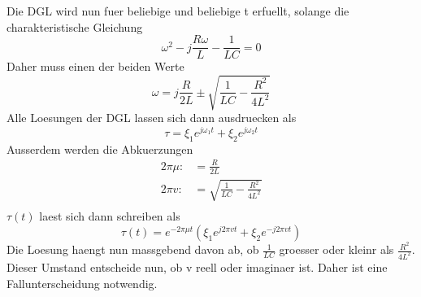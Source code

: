 \documentclass[titlepage=firstcover, captions=tableheading]{scrartcl}
\begin{document}
Die DGL wird nun fuer beliebige \xi und beliebige t erfuellt, solange \omega die charakteristische Gleichung 
\begin{equation}
    \omega^2-j\frac{R\omega}{L}-\frac{1}{LC}=0 \nonumber
\end{equation}
Daher muss \omega einen der beiden Werte 
\begin{equation}
    \omega=j\frac{R}{2L}\pm \sqrt{\frac{1}{LC}-\frac{R^2}{4L^2}}\nonumber
\end{equation}
Alle Loesungen der DGL lassen sich dann ausdruecken als 
\begin{equation}
    \tau=\xi_1e^{j\omega_1t}+\xi_2e^{j\omega_2t}\nonumber
\end{equation}
Ausserdem werden die Abkuerzungen 
\begin{align}
    2\pi\mu:&=\frac{R}{2L}\nonumber\\
    2\pi v:&=\sqrt{\frac{1}{LC}-\frac{R^2}{4L^2}}\nonumber\\
\end{align}
$\tau(t)$ laest sich dann schreiben als
\begin{equation}\label{Klammer}
    \tau(t)=e^{-2\pi\mu t}(\xi_1e^{j2\pi vt}+\xi_2e^{-j2\pi vt})
\end{equation}
Die Loesung haengt nun massgebend davon ab, ob $\frac{1}{LC}$ groesser oder kleinr als $\frac{R^2}{4L^2}$. Dieser Umstand entscheide nun, ob v reell oder imaginaer ist. Daher ist eine Fallunterscheidung notwendig.
\end{document}
